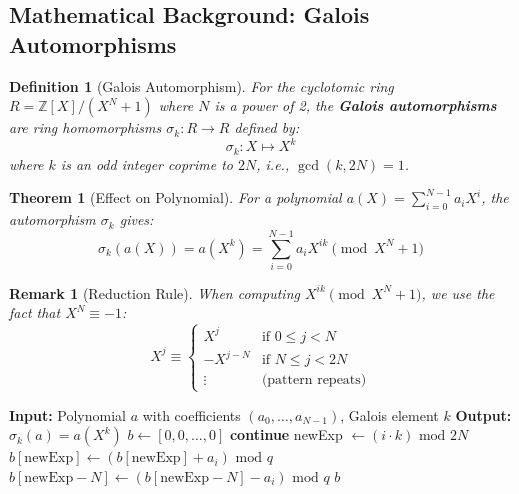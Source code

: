 \documentclass[11pt,a4paper]{article}
\newtheorem{definition}{Definition}
\newtheorem{theorem}{Theorem}
\newtheorem{remark}{Remark}
\newcommand{\Z}{\mathbb{Z}}
\newcommand{\bmod}{\text{ mod }}
\begin{document}
\subsection{Mathematical Background: Galois Automorphisms}

\begin{definition}[Galois Automorphism]
For the cyclotomic ring $R = \Z[X]/(X^N + 1)$ where $N$ is a power of 2, the \textbf{Galois automorphisms} are ring homomorphisms $\sigma_k: R \to R$ defined by:
\[
\sigma_k: X \mapsto X^k
\]
where $k$ is an odd integer coprime to $2N$, i.e., $\gcd(k, 2N) = 1$.
\end{definition}

\begin{theorem}[Effect on Polynomial]
For a polynomial $a(X) = \sum_{i=0}^{N-1} a_i X^i$, the automorphism $\sigma_k$ gives:
\[
\sigma_k(a(X)) = a(X^k) = \sum_{i=0}^{N-1} a_i X^{ik} \pmod{X^N + 1}
\]
\end{theorem}

\begin{remark}[Reduction Rule]
When computing $X^{ik} \pmod{X^N + 1}$, we use the fact that $X^N \equiv -1$:
\[
X^j \equiv \begin{cases}
X^j & \text{if } 0 \leq j < N \\
-X^{j-N} & \text{if } N \leq j < 2N \\
\vdots & \text{(pattern repeats)}
\end{cases}
\]
\end{remark}

\begin{algorithm}[H]
\caption{Apply Automorphism to Polynomial}
\begin{algorithmic}[1]
    \State \textbf{Input:} Polynomial $a$ with coefficients $(a_0, \ldots, a_{N-1})$, Galois element $k$
    \State \textbf{Output:} $\sigma_k(a) = a(X^k)$
    \State
    \State $b \gets [0, 0, \ldots, 0]$ 
         \textbf{continue} \EndIf
        \State newExp $\gets (i \cdot k) \bmod 2N$
            \State $b[\text{newExp}] \gets (b[\text{newExp}] + a_i) \bmod q$
        \Else
            \State $b[\text{newExp} - N] \gets (b[\text{newExp} - N] - a_i) \bmod q$ 
        \EndIf
    \EndFor
    \State \Return $b$
\EndFunction
\end{algorithmic}
\end{algorithm}
\end{document}
